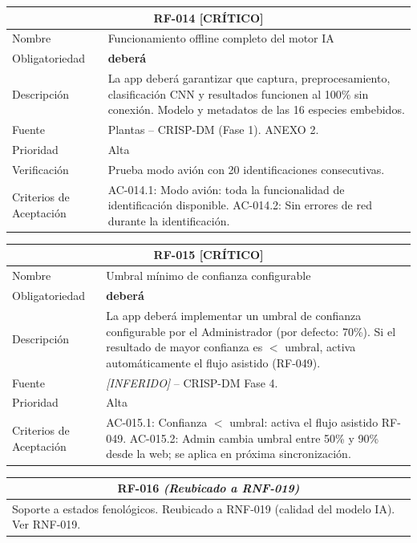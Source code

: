 \documentclass[12pt, a4paper]{article}
\newcommand{\criticomark}{\textcolor{criticolor}{\textbf{[CR\'ITICO]}}}
\newcommand{\inferido}{\textcolor{medio}{\textit{[INFERIDO]}}}
\begin{document}
\begin{longtable}{|p{3cm}|p{11.5cm}|}
\hline
\multicolumn{2}{|c|}{\textbf{RF-014} \criticomark} \\
\hline
Nombre & Funcionamiento offline completo del motor IA \\
\hline
Obligatoriedad & \textbf{deber\'a} \\
\hline
Descripci\'on & La app deber\'a garantizar que captura, preprocesamiento, clasificaci\'on CNN y resultados funcionen al 100\% sin conexi\'on. Modelo y metadatos de las 16 especies embebidos. \\
\hline
Fuente & Plantas -- CRISP-DM (Fase 1). ANEXO 2. \\
\hline
Prioridad & Alta \\
\hline
Verificaci\'on & Prueba modo avi\'on con 20 identificaciones consecutivas. \\
\hline
Criterios de Aceptaci\'on &
AC-014.1: Modo avi\'on: toda la funcionalidad de identificaci\'on disponible. \newline
AC-014.2: Sin errores de red durante la identificaci\'on. \\
\hline
\end{longtable}

\begin{longtable}{|p{3cm}|p{11.5cm}|}
\hline
\multicolumn{2}{|c|}{\textbf{RF-015} \criticomark} \\
\hline
Nombre & Umbral m\'inimo de confianza configurable \\
\hline
Obligatoriedad & \textbf{deber\'a} \\
\hline
Descripci\'on & La app deber\'a implementar un umbral de confianza configurable por el Administrador (por defecto: 70\%). Si el resultado de mayor confianza es $<$ umbral, activa autom\'aticamente el flujo asistido (RF-049). \\
\hline
Fuente & \inferido{} -- CRISP-DM Fase 4. \\
\hline
Prioridad & Alta \\
\hline
Criterios de Aceptaci\'on &
AC-015.1: Confianza $<$ umbral: activa el flujo asistido RF-049. \newline
AC-015.2: Admin cambia umbral entre 50\% y 90\% desde la web; se aplica en pr\'oxima sincronizaci\'on. \\
\hline
\end{longtable}

\begin{longtable}{|p{3cm}|p{11.5cm}|}
\hline
\multicolumn{2}{|c|}{\textbf{RF-016} \textit{(Reubicado a RNF-019)}} \\
\hline
\multicolumn{2}{|p{14.5cm}|}{Soporte a estados fenol\'ogicos. Reubicado a RNF-019 (calidad del modelo IA). Ver RNF-019.} \\
\hline
\end{longtable}
\end{document}

